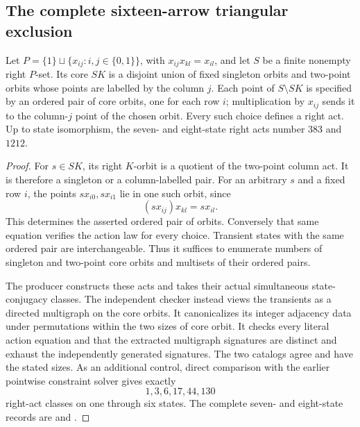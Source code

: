 \subsection{The complete sixteen-arrow triangular exclusion}

\begin{lemma}
\label{C:P5-right-act-normal-forms}
Let $P=\{1\}\sqcup\{x_{ij}:i,j\in\{0,1\}\}$, with
$x_{ij}x_{kl}=x_{il}$, and let $S$ be a finite nonempty right
$P$-set.  Its core $SK$ is a disjoint union of fixed singleton
orbits and two-point orbits whose points are labelled by the
column $j$.  Each point of $S\setminus SK$ is specified by an
ordered pair of core orbits, one for each row $i$; multiplication
by $x_{ij}$ sends it to the column-$j$ point of the chosen orbit.
Every such choice defines a right act.  Up to state isomorphism,
the seven- and eight-state right acts number $383$ and $1212$.
\end{lemma}
\begin{proof}
For $s\in SK$, its right $K$-orbit is a quotient of the two-point
column act.  It is therefore a singleton or a column-labelled
pair.  For an arbitrary $s$ and a fixed row $i$, the points
$s x_{i0},s x_{i1}$ lie in one such orbit, since
\[
 (s x_{ij})x_{kl}=s x_{il}.
\]
This determines the asserted ordered pair of orbits.  Conversely
that same equation verifies the action law for every choice.
Transient states with the same ordered pair are interchangeable.
Thus it suffices to enumerate numbers of singleton and two-point
core orbits and multisets of their ordered pairs.

The producer  constructs these acts
and takes their actual simultaneous state-conjugacy classes.
The independent checker
 instead views the
transients as a directed multigraph on the core orbits.  It
canonicalizes its integer adjacency data under permutations
within the two sizes of core orbit.  It checks every literal
action equation and that the extracted multigraph signatures
are distinct and exhaust the independently generated signatures.
The two catalogs agree and have the stated sizes.  As an
additional control, direct comparison with the earlier pointwise
constraint solver gives exactly
\[
 1,3,6,17,44,130
\]
right-act classes on one through six states.
The complete seven- and eight-state records are
and
.
\end{proof}

